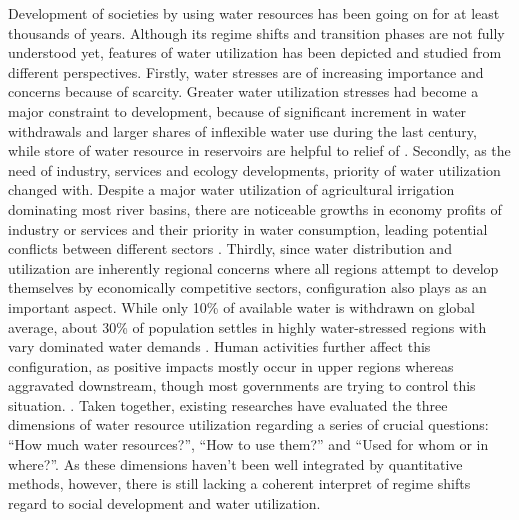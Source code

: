 \documentclass[9pt, twocolumn, twoside, lineno]{pnas-new}
\begin{document}
Development of societies by using water resources has been going on for at least thousands of years. Although its regime shifts and transition phases are not fully understood yet, features of water utilization has been depicted and studied from different perspectives.
Firstly, water stresses are of increasing importance and concerns because of scarcity.
Greater water utilization stresses had become a major constraint to development, because of significant increment in water withdrawals and larger shares of inflexible water use during the last century, while store of water resource in reservoirs are helpful to relief of
\cite{postelHumanAppropriationRenewable1996, greveGlobalAssessmentWater2018, qinFlexibilityIntensityGlobal2019}.
Secondly, as the need of industry, services and ecology developments, priority of water utilization changed with. 
Despite a major water utilization of agricultural irrigation dominating most river basins, there are noticeable growths in economy profits of industry or services and their priority in water consumption, leading potential conflicts between different sectors
\cite{liuWaterScarcityAssessments2017, florkeWaterCompetitionCities2018}.
Thirdly, since water distribution and utilization are inherently regional concerns where all regions attempt to develop themselves by economically competitive sectors, configuration also plays as an important aspect.
While only 10\% of available water is withdrawn on global average, about 30\% of population settles in highly water-stressed regions with vary dominated water demands
\cite{wadaWedgeApproachWater2014, okiGlobalHydrologicalCycles2006}.
Human activities further affect this configuration, as positive impacts mostly occur in upper regions whereas aggravated downstream, though most governments are trying to control this situation. 
\cite{veldkampWaterScarcityHotspots2017}. 
Taken together, existing researches have evaluated the three dimensions of water resource utilization regarding a series of crucial questions: ``How much water resources?'', ``How to use them?'' and ``Used for whom or in where?''.
As these dimensions haven't been well integrated by quantitative methods, however, there is still lacking a coherent interpret of regime shifts regard to social development and water utilization.
\end{document}
